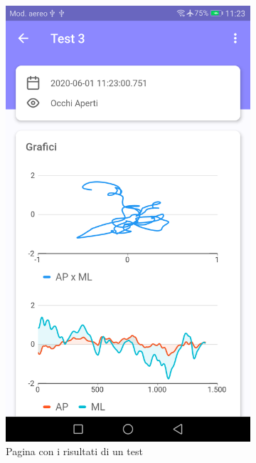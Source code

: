 \begin{figure}
\begin{subfigure}[b]{0.33\textwidth}
      \includegraphics[width=\textwidth]{figures/screenshot/result.png}
      \caption{Pagina con i risultati di un test}
      \label{fig:result}
  \end{subfigure}
  \hspace{0.15\textwidth}%
  \begin{subfigure}[b]{0.33\textwidth}

\end{subfigure}
\end{figure}
